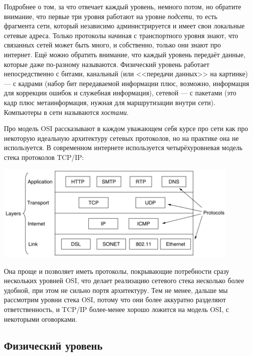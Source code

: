 \documentclass{../../text-style}
\begin{document}
Подробнее о том, за что отвечает каждый уровень, немного потом, но обратите внимание, что первые три уровня работают на уровне \textit{подсети}, то есть фрагмента сети, который независимо администрируется и имеет свои локальные сетевые адреса. Только протоколы начиная с транспортного уровня знают, что связанных сетей может быть много, и собственно, только они знают про интернет. Ещё можно обратить внимание, что каждый уровень передаёт данные, которые даже по-разному называются. Физический уровень работает непосредственно с битами, канальный (или <<передачи данных>> на картинке) --- с кадрами (набор бит передаваемой информации плюс, возможно, информация для коррекции ошибок и служебная информация), сетевой --- с пакетами (это кадр плюс метаинформация, нужная для маршрутизации внутри сети). Компьютеры в сети называются \textit{хостами}.

Про модель OSI рассказывают в каждом уважающем себя курсе про сети как про некоторую идеальную архитектуру сетевых протоколов, но на практике она не используется. В современном интернете используется четырёхуровневая модель стека протоколов TCP/IP:

\begin{center}
    \includegraphics[width=0.9\textwidth]{tcpIpStack.png}
\end{center}

Она проще и позволяет иметь протоколы, покрывающие потребности сразу нескольких уровней OSI, что делает реализацию сетевого стека несколько более удобной, при этом не сильно портя архитектуру. Тем не менее, дальше мы рассмотрим уровни стека OSI, потому что они более аккуратно разделяют ответственность, и TCP/IP более-менее хорошо ложится на модель OSI, с некоторыми оговорками.

\subsection{Физический уровень}
\end{document}
